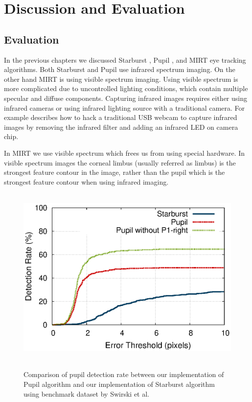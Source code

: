 \chapter{Discussion and Evaluation} 

\section{Evaluation}
In the previous chapters we discussed Starburst \cite{starburst}, Pupil \cite{pupil}, and MIRT eye tracking algorithms. Both Starburst and Pupil use infrared spectrum imaging. On the other hand MIRT is using visible spectrum imaging. Using visible spectrum is more complicated due to uncontrolled lighting conditions, which contain multiple specular and diffuse components. Capturing infrared images requires either using infrared cameras or using infrared lighting source with a traditional camera. For example \cite{scriptwear} describes  how to hack a traditional USB webcam to capture infrared images by removing the infrared filter and adding an infrared LED on camera chip. \bigskip

In MIRT we use visible spectrum which frees us from using special hardware. In visible spectrum images the corneal limbus (usually referred as limbus) is the strongest feature contour in the image, rather than the pupil which is the strongest feature contour when using infrared imaging. \bigskip

\begin{figure}[!h]
\begin{dBox}
\centering
	\mbox{
		\includegraphics[width=\textwidth]{./Pictures/evaluation/error.eps}
	}
   \caption{Comparison of pupil detection rate between our implementation of Pupil algorithm and our implementation of Starburst algorithm using benchmark dataset by Swirski et al.\label{fig:our_eval} }   
\end{dBox}   
\end{figure}

